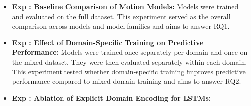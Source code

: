        \begin{itemize}
            
        \item{\textbf{Exp : Baseline Comparison of Motion Models:}} %
        Models were trained and evaluated on the full dataset. This experiment served as the overall comparison across models and model families and aims to answer RQ1.




        \item{\textbf{Exp : Effect of Domain-Specific Training on Predictive Performance:}}
        Models were trained once separately per domain and once on the mixed dataset. They were then evaluated separately within each domain. This experiment tested whether domain-specific training improves predictive performance compared to mixed-domain training and aims to answer RQ2. 

         \item{\textbf{Exp : Ablation of Explicit Domain Encoding for LSTMs:}}
        

\end{itemize}
